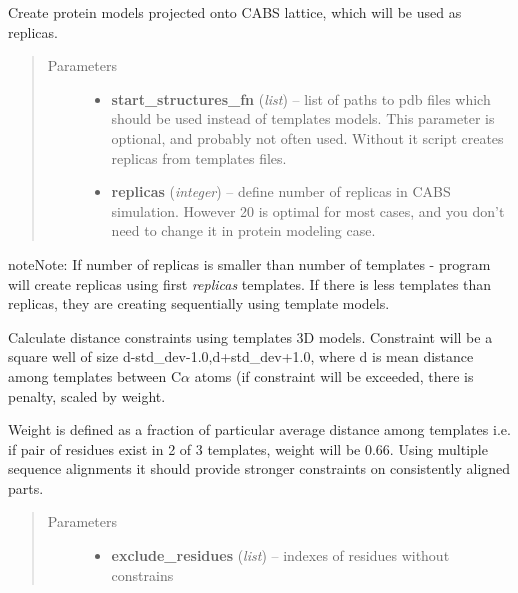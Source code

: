 \documentclass[letterpaper,10pt,english]{sphinxmanual}
\begin{document}
\begin{fulllineitems}
\begin{fulllineitems}
\label{api:pycabs.CABS.createLatticeReplicas}
Create protein models projected onto CABS lattice, which will be used as replicas.
\begin{quote}\begin{description}
\item[{Parameters}] \leavevmode\begin{itemize}
\item {} 
\textbf{start\_structures\_fn} (\emph{list}) -- list of paths to pdb files which should be used instead of templates models.  This parameter is optional, and probably not often used. Without it script creates replicas from templates files.

\item {} 
\textbf{replicas} (\emph{integer}) -- define number of replicas in CABS simulation. However 20 is optimal for most cases, and you don't need to change it in protein modeling case.

\end{itemize}

\end{description}\end{quote}

\begin{notice}{note}{Note:}
If number of replicas is smaller than number of templates - program will create replicas using first \emph{replicas} templates. If there is less templates than replicas, they are creating sequentially using template models.
\end{notice}

\end{fulllineitems}


\begin{fulllineitems}
\label{api:pycabs.CABS.generateConstraints}
Calculate distance constraints using templates 3D models. Constraint will be a square well of size d-std\_dev-1.0,d+std\_dev+1.0, where d is mean distance among templates between C\(\alpha\) atoms (if constraint will be exceeded, there is penalty, scaled by weight.

Weight is defined as a fraction of particular average distance among templates i.e. if pair of residues exist in 2 of 3 templates, weight will be 0.66. Using multiple sequence alignments it should provide stronger constraints on consistently aligned parts.
\begin{quote}\begin{description}
\item[{Parameters}] \leavevmode\begin{itemize}
\item {} 
\textbf{exclude\_residues} (\emph{list}) -- indexes of residues without constrains


\end{itemize}
\end{description}
\end{quote}
\end{fulllineitems}
\end{fulllineitems}
\end{document}
